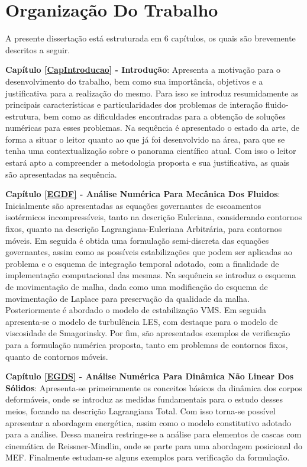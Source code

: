 \section{Organização Do Trabalho}

A presente dissertação está estruturada em 6 capítulos, os quais são brevemente descritos a seguir.

    {
        \newcommand{\Capi}[2]{\textbf{Capítulo #1 - #2}:}

        \Capi{\ref{CapIntroducao}}{Introdução} Apresenta a motivação para o desenvolvimento do trabalho, bem como sua importância, objetivos e a justificativa para a realização do mesmo. Para isso se introduz resumidamente as principais características e particularidades dos problemas de interação fluido-estrutura, bem como as dificuldades encontradas para a obtenção de soluções numéricas para esses problemas. Na sequência é apresentado o estado da arte, de forma a situar o leitor quanto ao que já foi desenvolvido na área, para que se tenha uma contextualização sobre o panorama científico atual. Com isso o leitor estará apto a compreender a metodologia proposta e sua justificativa, as quais são apresentadas na sequência.

        \Capi{\ref{EGDF}}{Análise Numérica Para Mecânica Dos Fluidos} Inicialmente são apresentadas as equações governantes de escoamentos isotérmicos incompressíveis, tanto na descrição Euleriana, considerando contornos fixos, quanto na descrição Lagrangiana-Euleriana Arbitrária, para contornos móveis. Em seguida é obtida uma formulação semi-discreta das equações governantes, assim como as possíveis estabilizações que podem ser aplicadas ao problema e o esquema de integração temporal adotado, com a finalidade de implementação computacional das mesmas. Na sequência se introduz o esquema de movimentação de malha, dada como uma modificação do esquema de movimentação de Laplace para preservação da qualidade da malha. Posteriormente é abordado o modelo de estabilização VMS. Em seguida apresenta-se o modelo de turbulência LES, com destaque para o modelo de viscosidade de Smagorinsky. Por fim, são apresentados exemplos de verificação para a formulação numérica proposta, tanto em problemas de contornos fixos, quanto de contornos móveis.

        \Capi{\ref{EGDS}}{Análise Numérica Para Dinâmica Não Linear Dos Sólidos} Apresenta-se primeiramente os conceitos básicos da dinâmica dos corpos deformáveis, onde se introduz as medidas fundamentais para o estudo desses meios, focando na descrição Lagrangiana Total. Com isso torna-se possível apresentar a abordagem energética, assim como o modelo constitutivo adotado para a análise. Dessa maneira restringe-se a análise para elementos de cascas com cinemática de Reissner-Mindlin, onde se parte para uma abordagem posicional do MEF. Finalmente estudam-se alguns exemplos para verificação da formulação.

}
